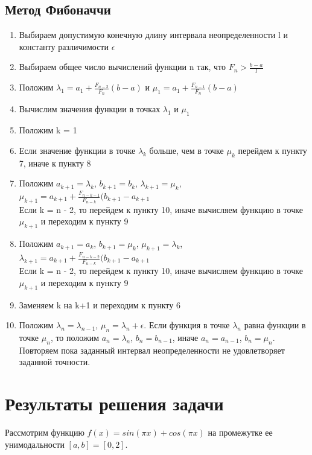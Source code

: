 \documentclass[main.tex]{subfiles}
\begin{document}
	\subsection{Метод Фибоначчи}
	\begin{enumerate}
		\item Выбираем допустимую конечную длину интервала неопределенности l и константу различимости $\epsilon$ 
		\item Выбираем общее число вычислений функции n так, что $F_n >\frac{b-a}{l}$
		\item Положим $\lambda_1 = a_1+\frac{F_{n-2}}{F_n}(b-a)$ и  $\mu_1 = a_1+\frac{F_{n-1}}{F_n}(b-a)$
		\item Вычислим значения функции в точках $\lambda_1$ и $\mu_1$
		\item Положим k = 1
		\item Если значение функции в точке $\lambda_k$ больше, чем в точке $\mu_k$ перейдем к пункту 7, иначе к пункту 8
		\item Положим $a_{k+1} = \lambda_k$, $b_{k+1} = b_k$, $\lambda_{k+1} = \mu_k$, $\mu_{k+1} = a_{k+1}+\frac{F_{n-k-1}}{F_{n-k}}(b_{k+1}-a_{k+1}$\\
		Если k = n - 2, то перейдем к пункту 10, иначе вычисляем функцию в точке $\mu_{k+1}$ и переходим к пункту 9
		\item Положим $a_{k+1} = a_k$, $b_{k+1} = \mu_k$, $\mu_{k+1} = \lambda_k$, $\lambda_{k+1} = a_{k+1}+\frac{F_{n-k-2}}{F_{n-k}}(b_{k+1}-a_{k+1}$\\
		Если k = n - 2, то перейдем к пункту 10, иначе вычисляем функцию в точке $\mu_{k+1}$ и переходим к пункту 9
		\item Заменяем k на k+1 и переходим к пункту 6
		\item Положим $\lambda_{n} = \lambda_{n-1}$, $\mu_{n} = \lambda_n + \epsilon$. Если функция в точке $\lambda_n$ равна функции в точке $\mu_n$, то положим $a_n = \lambda_n$, $b_n=b_{n-1}$, иначе $a_n = a_{n-1}$, $b_n=\mu_n$. Повторяем пока заданный интервал неопределенности не удовлетворяет заданной точности.
	\end{enumerate}
	
	\section{Результаты решения задачи}
	Рассмотрим функцию \newline$f(x) = sin(\pi x) + cos(\pi x)$ на промежутке ее унимодальности $[a, b] = [0, 2].$\\
	
\end{document}
